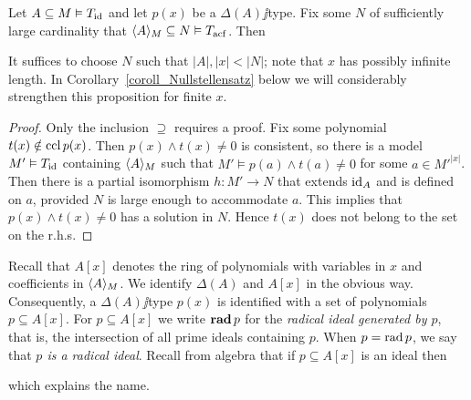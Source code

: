 \documentclass[creche.tex]{subfiles}
\begin{document}
\begin{proposition}\label{prop_Nullstellensatz}
Let $A\subseteq M\models T_{\rm id}$ and let $p(x)$ be a $\Delta(A)\jj$type. Fix some $N$ of sufficiently large cardinality that $\<A\>_M\subseteq N\models T_{\rm acf}$. Then 


\end{proposition}

It suffices to choose $N$ such that $|A|,|x|< |N|$; note that $x$ has possibly infinite length. In Corollary~\ref{coroll_Nullstellensatz} below we will considerably strengthen this proposition for finite $x$.

\begin{proof} Only the inclusion $\supseteq$ requires a proof.  Fix some polynomial $t(x)\notin\ccl\, p(x)$. Then $p(x)\wedge t(x)\neq0$ is consistent, so there is a model $M'\models T_{\rm id}$ containing $\<A\>_M$ such that $M'\models p(a)\wedge t(a)\neq0$ for some $a\in {M'}^{|x|}$. Then there is a partial isomorphism $h:M'\to N$ that extends $\id_A$ and is defined on $a$, provided $N$ is large enough to accommodate $a$. This implies that $p(x)\wedge t(x)\neq0$ has a solution in $N$. Hence $t(x)$ does not belong to the set on the r.h.s.  
\end{proof}

Recall that $A[x]$ denotes the ring of polynomials with variables in $x$ and coefficients in $\<A\>_M$. We identify $\Delta(A)$ and $A[x]$ in the obvious way. Consequently, a $\Delta(A)\jj$type $p(x)$ is identified with a set of polynomials $p\subseteq A[x]$. For $p\subseteq A[x]$ we write \emph{${\rm\bf rad}\,p$} for the \emph{radical ideal generated by $p$}, that is, the intersection of all prime ideals containing $p$. When $p=\rad p$, we say that  \emph{$p$ is a radical ideal}. Recall from algebra that if $p\subseteq A[x]$ is an ideal then


which explains the name.
\end{document}
